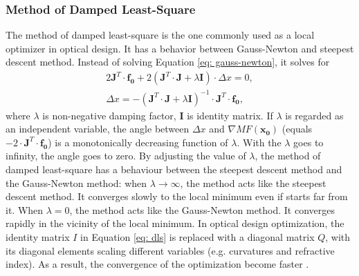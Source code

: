 \subsubsection{Method of Damped Least-Square}

The method of damped least-square is the one commonly used as a local optimizer in optical design. It has a behavior between Gauss-Newton and steepest descent method.  
Instead of solving Equation \ref{eq: gauss-newton}, it solves for 
\begin{equation} \label{eq: dls}
\begin{split}
2 \pmb{J}^{T} \cdot \pmb{f_0} + 2(\pmb{J}^T \cdot \pmb{J} + \lambda \pmb{I} )\cdot \Delta x = 0 , \\
\Delta x = - (\pmb{J}^T \cdot \pmb{J} + \lambda \pmb{I} )^{-1} \cdot \pmb{J}^{T} \cdot \pmb{f_0},
\end{split}
\end{equation}where $\lambda$ is non-negative damping factor, $\pmb{I}$ is identity matrix. If $\lambda$ is regarded as an independent variable, the angle between $\Delta x$ and $\nabla MF(\pmb{x_0}) $ (equals $-2 \cdot \pmb{J}^{T} \cdot \pmb{f_0}$) is a monotonically decreasing function of $\lambda$. With the $\lambda$ goes to infinity, the angle goes to zero. By adjusting the value of $\lambda$, the method of damped least-square has a behaviour between the steepest descent method and the Gauss-Newton method: when $\lambda \rightarrow \infty $, the method acts like the steepest descent method. It converges slowly to the local minimum even if starts far from it. When $\lambda = 0$, the method acts like the Gauss-Newton method. It converges rapidly in the vicinity of the local minimum. 
In optical design optimization, the identity matrix $I$ in Equation \ref{eq: dls} is replaced with a diagonal matrix $Q$, with its diagonal elements scaling different variables (e.g. curvatures and refractive index). As a result, the convergence of the optimization become faster \cite{Meiron:65_dls}.

